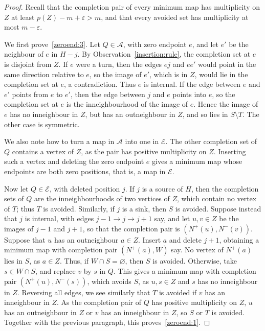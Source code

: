 \begin{proof}
Recall that the completion pair of every minimum map has multiplicity on $Z$ at least $p(Z)-m+\varepsilon>m$, and that every avoided set has multiplicity at most $m-\varepsilon$.

We first prove~\ref{zeroend:3}. Let $Q\in\mathcal A$, with zero endpoint $e$, and let $e'$ be the neighbour of $e$ in $H-j$. By Observation~\ref{insertion:rule}, the completion set at $e$ is disjoint from $Z$. If $e$ were a turn, then the edges $ej$ and $ee'$ would point in the same direction relative to $e$, so the image of $e'$, which is in $Z$, would lie in the completion set at $e$, a contradiction. Thus $e$ is internal. If the edge between $e$ and $e'$ points from $e$ to $e'$, then the edge between $j$ and $e$ points into $e$, so the completion set at $e$ is the inneighbourhood of the image of $e$. Hence the image of $e$ has no inneighbour in $Z$, but has an outneighbour in $Z$, and so lies in $S\setminus T$. The other case is symmetric.

We also note how to turn a map in $\mathcal A$ into one in $\mathcal E$. The other completion set of $Q$ contains a vertex of $Z$, as the pair has positive multiplicity on $Z$. Inserting such a vertex and deleting the zero endpoint $e$ gives a minimum map whose endpoints are both zero positions, that is, a map in $\mathcal E$.

Now let $Q\in\mathcal E$, with deleted position $j$. If $j$ is a source of $H$, then the completion sets of $Q$ are the inneighbourhoods of two vertices of $Z$, which contain no vertex of $T$; thus $T$ is avoided. Similarly, if $j$ is a sink, then $S$ is avoided.
Suppose instead that $j$ is internal, with edges $j-1\to j\to j+1$ say, and let $u,v\in Z$ be the images of $j-1$ and $j+1$, so that the completion pair is $(N^+(u),N^-(v))$. Suppose that $u$ has an outneighbour $a\in Z$. Insert $a$ and delete $j+1$, obtaining a minimum map with completion pair $(N^+(a),W)$ say. No vertex of $N^+(a)$ lies in $S$, as $a\in Z$. Thus, if $W\cap S=\varnothing$, then $S$ is avoided. Otherwise, take $s\in W\cap S$, and replace $v$ by $s$ in $Q$. This gives a minimum map with completion pair $(N^+(u),N^-(s))$, which avoids $S$, as $u,s\in Z$ and $s$ has no inneighbour in $Z$.
Reversing all edges, we see similarly that $T$ is avoided if $v$ has an inneighbour in $Z$. As the completion pair of $Q$ has positive multiplicity on $Z$, $u$ has an outneighbour in $Z$ or $v$ has an inneighbour in $Z$, so $S$ or $T$ is avoided. Together with the previous paragraph, this proves~\ref{zeroend:1}.


\end{proof}
